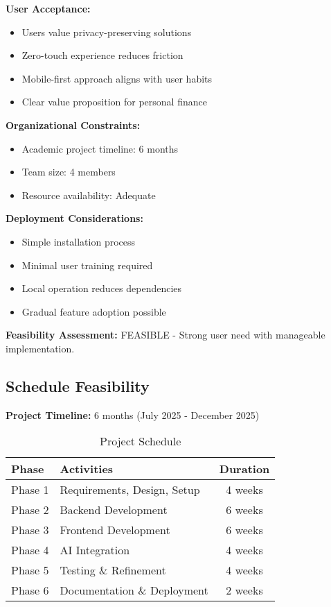 \documentclass[11pt,a4paper]{report}
\begin{document}
\textbf{User Acceptance:}
\begin{itemize}
    \item Users value privacy-preserving solutions
    \item Zero-touch experience reduces friction
    \item Mobile-first approach aligns with user habits
    \item Clear value proposition for personal finance
\end{itemize}

\textbf{Organizational Constraints:}
\begin{itemize}
    \item Academic project timeline: 6 months
    \item Team size: 4 members
    \item Resource availability: Adequate
\end{itemize}

\textbf{Deployment Considerations:}
\begin{itemize}
    \item Simple installation process
    \item Minimal user training required
    \item Local operation reduces dependencies
    \item Gradual feature adoption possible
\end{itemize}

\textbf{Feasibility Assessment:} FEASIBLE - Strong user need with manageable implementation.

\subsection{Schedule Feasibility}

\textbf{Project Timeline:} 6 months (July 2025 - December 2025)

\begin{table}[h]
\centering
\caption{Project Schedule}
\begin{tabular}{|l|l|c|}
\hline
\textbf{Phase} & \textbf{Activities} & \textbf{Duration} \\
\hline
Phase 1 & Requirements, Design, Setup & 4 weeks \\
Phase 2 & Backend Development & 6 weeks \\
Phase 3 & Frontend Development & 6 weeks \\
Phase 4 & AI Integration & 4 weeks \\
Phase 5 & Testing \& Refinement & 4 weeks \\
Phase 6 & Documentation \& Deployment & 2 weeks \\
\hline
\end{tabular}
\end{table}
\end{document}
